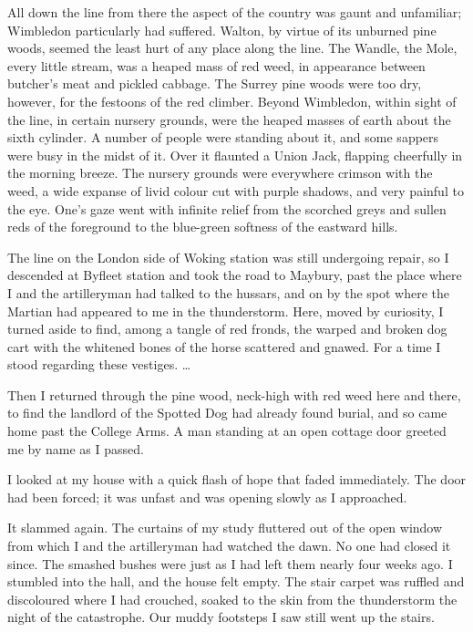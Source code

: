 All down the line from there the aspect of the country was gaunt
and unfamiliar; Wimbledon particularly had suffered. Walton, by
virtue of its unburned pine woods, seemed the least hurt of any
place along the line. The Wandle, the Mole, every little stream,
was a heaped mass of red weed, in appearance between butcher's meat
and pickled cabbage. The Surrey pine woods were too dry, however,
for the festoons of the red climber. Beyond Wimbledon, within sight
of the line, in certain nursery grounds, were the heaped masses of
earth about the sixth cylinder. A number of people were standing
about it, and some sappers were busy in the midst of it. Over it
flaunted a Union Jack, flapping cheerfully in the morning breeze.
The nursery grounds were everywhere crimson with the weed, a wide
expanse of livid colour cut with purple shadows, and very painful
to the eye. One's gaze went with infinite relief from the scorched
greys and sullen reds of the foreground to the blue-green softness
of the eastward hills.

The line on the London side of Woking station was still undergoing
repair, so I descended at Byfleet station and took the road to
Maybury, past the place where I and the artilleryman had talked to
the hussars, and on by the spot where the Martian had appeared to
me in the thunderstorm. Here, moved by curiosity, I turned aside to
find, among a tangle of red fronds, the warped and broken dog cart
with the whitened bones of the horse scattered and gnawed. For a
time I stood regarding these vestiges. \ldots{}

Then I returned through the pine wood, neck-high with red weed here
and there, to find the landlord of the Spotted Dog had already
found burial, and so came home past the College Arms. A man
standing at an open cottage door greeted me by name as I passed.

I looked at my house with a quick flash of hope that faded
immediately. The door had been forced; it was unfast and was
opening slowly as I approached.

It slammed again. The curtains of my study fluttered out of the
open window from which I and the artilleryman had watched the dawn.
No one had closed it since. The smashed bushes were just as I had
left them nearly four weeks ago. I stumbled into the hall, and the
house felt empty. The stair carpet was ruffled and discoloured
where I had crouched, soaked to the skin from the thunderstorm the
night of the catastrophe. Our muddy footsteps I saw still went up
the stairs.

